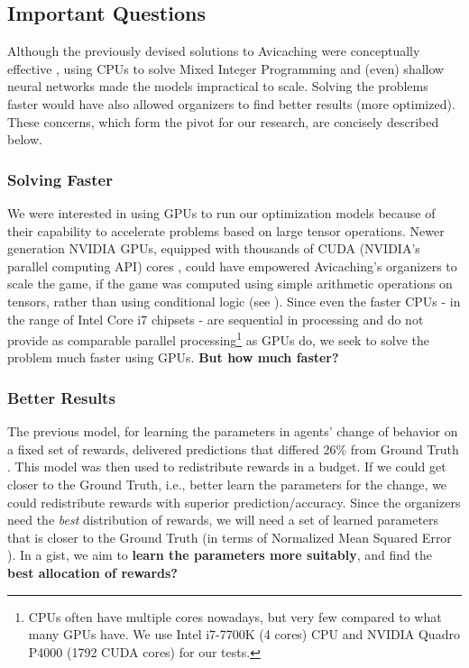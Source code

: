\subsection{Important Questions} \label{sec:Important Questions}
Although the previously devised solutions to Avicaching were conceptually effective \cite{Xue2016Avi1, Xue2016Avi2}, using CPUs to solve Mixed Integer Programming and (even) shallow neural networks made the models impractical to scale. Solving the problems faster would have also allowed organizers to find better results (more optimized). These concerns, which form the pivot for our research, are concisely described below.

\subsubsection{Solving Faster} \label{sec:Important Questions - Solving Faster}
We were interested in using GPUs to run our optimization models because of their capability to accelerate problems based on large tensor operations. Newer generation NVIDIA GPUs, equipped with thousands of CUDA (NVIDIA's parallel computing API) cores \cite{NVIDIA}, could have empowered Avicaching's organizers to scale the game, if the game was computed using simple arithmetic operations on tensors, rather than using conditional logic (see ). Since even the faster CPUs - in the range of Intel Core i7 chipsets - are sequential in processing and do not provide as comparable parallel processing\footnote{CPUs often have multiple cores nowadays, but very few compared to what many GPUs have. We use Intel i7-7700K (4 cores) CPU and NVIDIA Quadro P4000 (1792 CUDA cores) for our tests.} as GPUs do, we seek to solve the problem much faster using GPUs. \textbf{But how much faster?}

\subsubsection{Better Results} \label{sec:Important Questions - Better Results}
The previous model, for learning the parameters in agents' change of behavior on a fixed set of rewards, delivered predictions that differed 26\% from Ground Truth \cite[Table 1]{Xue2016Avi2}. This model was then used to redistribute rewards in a budget. If we could get closer to the Ground Truth, i.e., better learn the parameters for the change, we could redistribute rewards with superior prediction/accuracy. Since the organizers need the \textit{best} distribution of rewards, we will need a set of learned parameters that is closer to the Ground Truth (in terms of Normalized Mean Squared Error \cite[Section 4.2]{Xue2016Avi2}). In a gist, we aim to \textbf{learn the parameters more suitably}, and find the \textbf{best allocation of rewards?}

